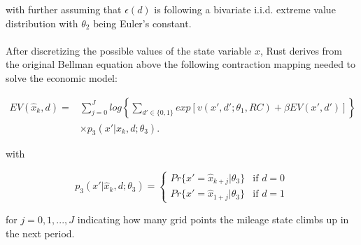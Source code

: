 with further assuming that $\epsilon(d)$ is following a bivariate i.i.d. extreme value distribution with $\theta_2$ being Euler's constant. \paragraph{}

After discretizing the possible values of the state variable $x$, Rust derives from the original Bellman equation above the following contraction mapping needed to solve the economic model:

\begin{equation}
\label{eq7}
	\begin{split}
		EV(\hat x_k, d) = &\sum_{j=0}^{J} log \left\{ \sum_{d'\in\{0, 1\}}  exp[v(x', d'; \theta_1, RC) + \beta EV(x', d')]\right\} \\[+3mm]
		&\times p_3(x'|\hat x_k, d; \theta_3). 
	\end{split}
\end{equation}

with

\[p_3(x'|\hat x_k, d; \theta_3) = \left\{
\begin{array}{lr}
	Pr\{x'=\hat x_{k+j}|\theta_3\}  & \mbox{if } d = 0 \\
	Pr\{x'=\hat x_{1+j}|\theta_3\} & \mbox{if } d = 1
\end{array}
\right.
\]

for $j=0, 1, ..., J$ indicating how many grid points the mileage state climbs up in the next period. \paragraph{}

